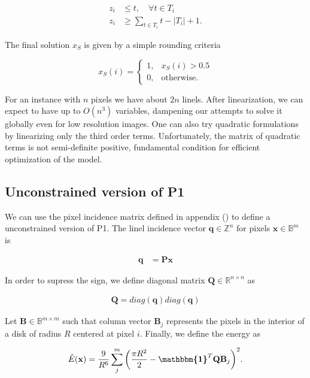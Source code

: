 	\begin{align*}
		z_i &\leq t, \quad \forall t \in T_i \\
		z_i &\geq \sum_{t \in T_i}{t} - |T_i| + 1.		
	\end{align*}

	The final solution $x_S$ is given by a simple rounding criteria
	
\[
	x_S(i) = \left\{ \begin{array}{ll}

		 	1,& x_S(i) > 0.5\\
		 	0,& \text{otherwise}.
 	
	\end{array}\right.
\]	

	For an instance with $n$ pixels we have about $2n$ linels. After linearization, we can expect to have up to $O(n^3)$ variables, dampening our attempts to solve it globally even for low resolution images. One can also try quadratic formulations by linearizing only the third order terms. Unfortunately, the matrix of quadratic terms is not semi-definite positive, fundamental condition for efficient optimization of the model.
	


\subsection{Unconstrained version of P1}

We can use the pixel incidence matrix defined in appendix () to define a unconstrained version of P1. The linel incidence vector $\mathbf{q} \in \mathbb{Z}^n$ for pixels $\mathbf{x} \in \mathbb{B}^{m}$ is 
	
	\begin{align*}
		\mathbf{q} &= \mathbf{P} \mathbf{x}
	\end{align*}

In order to supress the sign, we define diagonal matrix $\mathbf{Q} \in \mathbb{R}^{n \times n }$ as

\begin{align*}
	\mathbf{Q} = diag(\mathbf{q})diag(\mathbf{q})
\end{align*}

Let $\mathbf{B} \in \mathbb{B}^{m\times m}$ such that column vector $\mathbf{B}_j$ represents the pixels in the interior of a disk of radius $R$ centered at pixel $i$. Finally, we define the energy as

\begin{align}
	\hat{E}(\mathbf{x}) = \frac{9}{R^6}\sum_{j}^{m}{\left( \frac{\pi R^2}{2} - \boldsymbol{\mathbbm{1}}^T{\mathbf{Q}}\mathbf{B}_j \right)^2}.
	\label{eq:unconstrained-digital-elastica}
\end{align}


